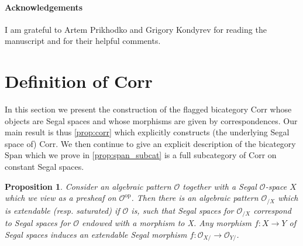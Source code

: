 \documentclass[a4paper, reqno]{amsart}
\newtheorem{prop}[theorem]{Proposition}
\theoremstyle{definition}
\newcommand\cO{\mathscr O}
\newcommand\op{\mathrm{op}}
\newcommand\spanc{\mathrm{Span}}
\newcommand\corr{\mathrm{Corr}}
\begin{document}
\paragraph{\textbf{Acknowledgements}} I am grateful to Artem Prikhodko and Grigory Kondyrev for reading the manuscript and for their helpful comments.
\section{Definition of Corr}\label{sect:two}
In this section we present the construction of the flagged bicategory $\corr$ whose objects are Segal spaces and whose morphisms are given by correspondences. Our main result is thus \cref{prop:corr} which explicitly constructs (the underlying Segal space of) $\corr$. We then continue to give an explicit description of the bicategory $\spanc$ which we prove in \cref{prop:span_subcat} is a full subcategory of $\corr$ on constant Segal spaces. 
\begin{prop}\label{prop:slice}
Consider an algebraic pattern $\cO$ together with a Segal $\cO$-space $X$ which we view as a presheaf on $\cO^\op$. Then there is an algebraic pattern $\cO_{/X}$ which is extendable (resp. saturated) if $\cO$ is, such that Segal spaces for $\cO_{/X}$ correspond to Segal spaces for $\cO$ endowed with a morphism to X. Any morphism $f:X\rightarrow Y$ of Segal spaces induces an extendable Segal morphism $f:\cO_{X/}\rightarrow\cO_{Y/}$.
\end{prop}
\end{document}
